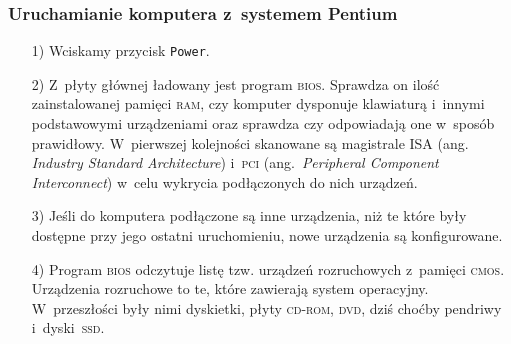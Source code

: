\documentclass[10pt,t]{beamer}
\begin{document}
\begin{frame}
  \frametitle{Uruchamianie komputera z~systemem Pentium}


  \begin{itemize}

  \item[1)] Wciskamy przycisk \texttt{Power}.

  \item[2)] Z~płyty głównej ładowany jest program \textsc{bios}. Sprawdza on
    ilość zainstalowanej pamięci \textsc{ram}, czy komputer dysponuje
    klawiaturą i~innymi podstawowymi urządzeniami oraz sprawdza czy
    odpowiadają one w~sposób prawidłowy. W~pierwszej kolejności skanowane
    są magistrale \textsc{ISA} (ang. \textit{Industry Standard
      Architecture}) i~\textsc{pci} (ang.~\textit{Peripheral Component
      Interconnect}) w~celu wykrycia podłączonych do nich urządzeń.

  \item[3)] Jeśli do komputera podłączone są inne urządzenia, niż te które
    były dostępne przy jego ostatni uruchomieniu, nowe urządzenia są
    konfigurowane.

  \item[4)] Program \textsc{bios} odczytuje listę tzw. urządzeń rozruchowych
    z~pamięci \textsc{cmos}. Urządzenia rozruchowe to te, które zawierają
    system operacyjny. W~przeszłości były nimi dyskietki, płyty
    \textsc{cd}-\textsc{rom}, \textsc{dvd}, dziś choćby pendriwy
    i~dyski~\textsc{ssd}.

  \end{itemize}

\end{frame}
\end{document}
